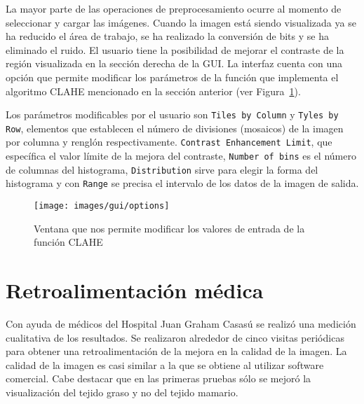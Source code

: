 La mayor parte de las operaciones de preprocesamiento ocurre al momento de
seleccionar y cargar las imágenes. Cuando la imagen está siendo visualizada ya
se ha reducido el área de trabajo, se ha realizado la conversión de bits y se
ha eliminado el ruido. El usuario tiene la posibilidad de mejorar el contraste
de la región visualizada en la sección derecha de la GUI. La interfaz cuenta
con una opción que permite modificar los parámetros de la función que
implementa el algoritmo CLAHE mencionado en la sección anterior (ver
Figura~\ref{options}).

Los parámetros modificables por el usuario son \texttt{Tiles by Column} y
\texttt{Tyles by Row}, elementos que establecen el número de divisiones
(mosaicos) de la imagen por columna y renglón respectivamente. \texttt{Contrast
Enhancement Limit}, que específica el valor límite de la mejora del contraste,
\texttt{Number of bins} es el número de columnas del histograma,
\texttt{Distribution} sirve para elegir la forma del histograma y con
\texttt{Range} se precisa el intervalo de los datos de la imagen de salida.

\begin{figure}[h]
  \begin{center}
    {\texttt{[image: images/gui/options]}}
  \end{center}
  \caption[GUI: Modificación de parámetros]
  {Ventana que nos permite modificar los valores de entrada de la función CLAHE}
  \label{options}
\end{figure}

\section{Retroalimentación médica}

Con ayuda de médicos del Hospital Juan Graham Casasú se realizó una medición
cualitativa de los resultados. Se realizaron alrededor de cinco visitas
periódicas para obtener una retroalimentación de la mejora en la calidad de la
imagen. La calidad de la imagen es casi similar a la que se obtiene al utilizar
software comercial. Cabe destacar que en las primeras pruebas sólo se mejoró la
visualización del tejido graso y no del tejido mamario.


